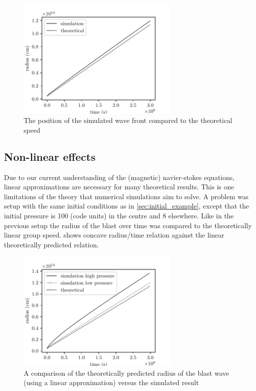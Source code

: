 \documentclass[a4paper]{article}
\let\oldcap\caption
\renewcommand{\caption}[1]{\parbox{.9\linewidth}{\oldcap{#1}}}
\begin{document}
\begin{figure}[h]
	\centering
	\includegraphics[width=0.7\textwidth]{figures/wavefront_position.pdf}
	\caption{The position of the simulated wave front compared to the theoretical speed}
	\label{fig:wave_front_speed}
\end{figure}

\subsection{Non-linear effects} \label{sec:nonlinear_effects}
Due to our current understanding of the (magnetic) navier-stokes equations, linear approximations are necessary for many theoretical results. 
This is one limitations of the theory that numerical simulations aim to solve.
A problem was setup with the same initial conditions as in \cref{sec:initial_example}, except that the initial pressure is 100 (code units) in the centre and 8 elsewhere. 
Like in the previous setup the radius of the blast over time was compared to the theoretically linear group speed.
 shows concave radius/time relation against the linear theoretically predicted relation. 
\begin{figure}[h]
	\centering
	\includegraphics[width=0.7\textwidth]{figures/non_linear_effects.pdf}
	\caption{A comparison of the theoretically predicted radius of the blast wave (using a linear approximation) versus the simulated result}
	\label{fig:non_linear_effects}
\end{figure}
\end{document}
